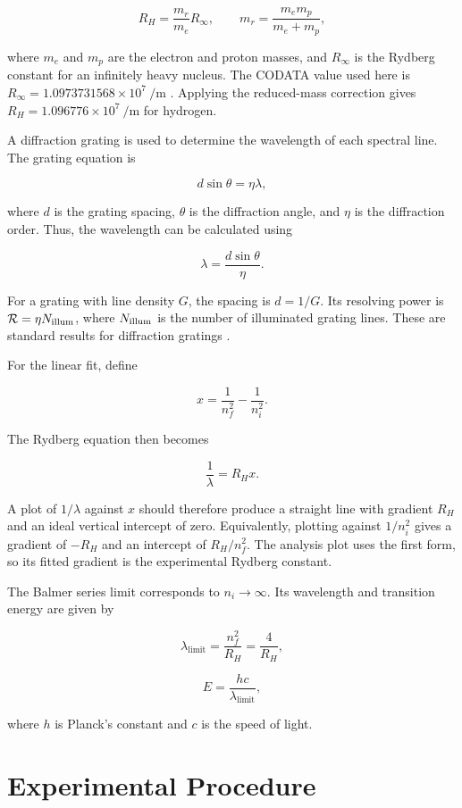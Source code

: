 \documentclass[12pt,a4paper]{article}
\begin{document}
\[
R_H = \frac{m_r}{m_e}R_\infty,
\qquad
m_r = \frac{m_e m_p}{m_e+m_p},
\]

where $m_e$ and $m_p$ are the electron and proton masses,
and $R_\infty$ is the Rydberg constant for an infinitely
heavy nucleus. The CODATA value used here is
$R_\infty=1.0973731568\times10^7\ \si{\per\metre}$
\cite{nistRydberg}.
Applying the reduced-mass correction gives
$R_H=1.096776\times10^7\ \si{\per\metre}$ for hydrogen.

A diffraction grating is used to determine the wavelength
of each spectral line. The grating equation is

\[
d\sin\theta = \eta\lambda,
\]

where $d$ is the grating spacing, $\theta$ is the diffraction
angle, and $\eta$ is the diffraction order. Thus, the wavelength
can be calculated using

\[
\lambda = \frac{d\sin\theta}{\eta}.
\]

For a grating with line density $G$, the spacing is $d=1/G$.
Its resolving power is $\mathcal{R}=\eta N_{\rm illum}$,
where $N_{\rm illum}$ is the number of illuminated grating
lines. These are standard results for diffraction gratings
\cite{openstaxDiffraction}.

For the linear fit, define

\[
x = \frac{1}{n_f^2}-\frac{1}{n_i^2}.
\]

The Rydberg equation then becomes

\[
\frac{1}{\lambda}=R_Hx.
\]

A plot of $1/\lambda$ against $x$ should therefore produce a
straight line with gradient $R_H$ and an ideal vertical
intercept of zero. Equivalently, plotting against $1/n_i^2$
gives a gradient of $-R_H$ and an intercept of $R_H/n_f^2$.
The analysis plot uses the first form, so its fitted gradient
is the experimental Rydberg constant.

The Balmer series limit corresponds to $n_i\rightarrow\infty$.
Its wavelength and transition energy are given by

\[
\lambda_{\text{limit}} = \frac{n_f^2}{R_H}
= \frac{4}{R_H},
\]

\[
E = \frac{hc}{\lambda_{\text{limit}}},
\]

where $h$ is Planck's constant and $c$ is the speed of light.

\newpage

\section{Experimental Procedure}
\end{document}
